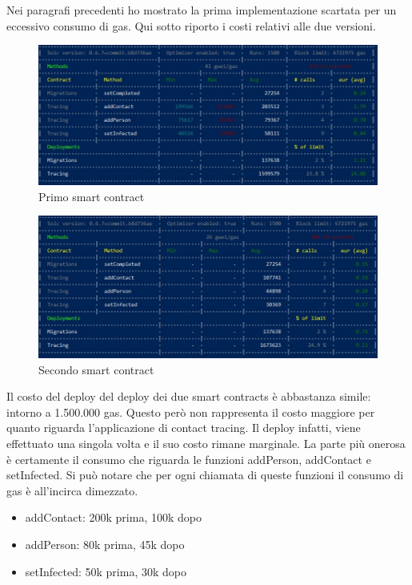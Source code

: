 Nei paragrafi precedenti ho mostrato la prima implementazione scartata per un eccessivo consumo di gas. Qui sotto riporto i costi relativi alle due versioni.

\begin{figure}[h]
\caption{Primo smart contract}
\centering
\includegraphics[width=1.0\textwidth]{./immagini/costiTracingOptimizer}
\end{figure}

\begin{figure}[h]
\caption{Secondo smart contract}
\centering
\includegraphics[width=1.0\textwidth]{./immagini/nuoviCosti}
\end{figure}

Il costo del deploy del deploy dei due smart contracts è abbastanza simile: intorno a 1.500.000 gas. Questo però non rappresenta il costo maggiore per quanto riguarda l’applicazione di contact tracing. 
Il deploy infatti, viene effettuato una singola volta e il suo costo rimane marginale.
La parte più onerosa è certamente il consumo che riguarda le funzioni addPerson, addContact e setInfected.
Si può notare che per ogni chiamata di queste funzioni il consumo di gas è all’incirca dimezzato.
\begin{itemize}
\item{addContact: 200k prima, 100k dopo}
\item{addPerson: 80k prima, 45k dopo}
\item{setInfected: 50k prima, 30k dopo}
\end{itemize}

